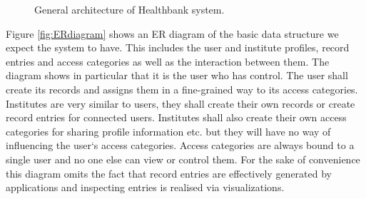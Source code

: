 \begin{figure}[ht]
%
\caption{General architecture of Healthbank system.}
\label{fig:architecture}
\end{figure} 

Figure \ref{fig:ERdiagram} shows an ER diagram of the basic data structure we expect the system to have. This includes the user and institute profiles, record entries and access categories as well as the interaction between them. The diagram shows in particular that it is the user who has control. The user shall create its records and assigns them in a fine-grained way to its access categories. Institutes are very similar to users, they shall create their own records or create record entries for connected users. Institutes shall also create their own access categories for sharing profile information etc. but they will have no way of influencing the user`s access categories. Access categories are always bound to a single user and no one else can view or control them. For the sake of convenience this diagram omits the fact that record entries are effectively generated by applications and inspecting entries is realised via visualizations.
 
